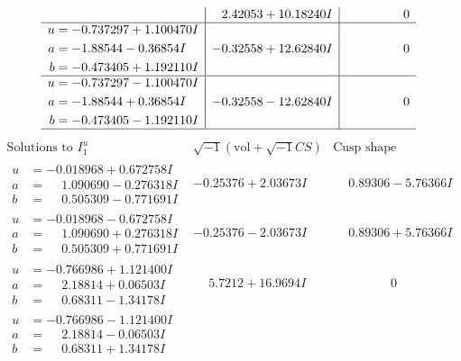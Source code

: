 \documentclass[1p]{elsarticle_modified}
\theoremstyle{definition}
\newcommand{\I}{\sqrt{-1}}
\begin{document}
$$\begin{array}{c|c|c}
 & \phantom{-}2.42053 + 10.18240 I & \phantom{-0.000000 } 0 \\ \hline\begin{aligned}
u &= -0.737297 + 1.100470 I \\
a &= -1.88544 - 0.36854 I \\
b &= -0.473405 + 1.192110 I\end{aligned}
 & -0.32558 + 12.62840 I & \phantom{-0.000000 } 0 \\ \hline\begin{aligned}
u &= -0.737297 - 1.100470 I \\
a &= -1.88544 + 0.36854 I \\
b &= -0.473405 - 1.192110 I\end{aligned}
 & -0.32558 - 12.62840 I & \phantom{-0.000000 } 0\\
 \hline 
 \end{array}$$\newpage$$\begin{array}{c|c|c}  
\text{Solutions to }I^u_{1}& \I (\text{vol} + \sqrt{-1}CS) & \text{Cusp shape}\\
 \hline 
\begin{aligned}
u &= -0.018968 + 0.672758 I \\
a &= \phantom{-}1.090690 - 0.276318 I \\
b &= \phantom{-}0.505309 - 0.771691 I\end{aligned}
 & -0.25376 + 2.03673 I & \phantom{-}0.89306 - 5.76366 I \\ \hline\begin{aligned}
u &= -0.018968 - 0.672758 I \\
a &= \phantom{-}1.090690 + 0.276318 I \\
b &= \phantom{-}0.505309 + 0.771691 I\end{aligned}
 & -0.25376 - 2.03673 I & \phantom{-}0.89306 + 5.76366 I \\ \hline\begin{aligned}
u &= -0.766986 + 1.121400 I \\
a &= \phantom{-}2.18814 + 0.06503 I \\
b &= \phantom{-}0.68311 - 1.34178 I\end{aligned}
 & \phantom{-}5.7212 + 16.9694 I & \phantom{-0.000000 } 0 \\ \hline\begin{aligned}
u &= -0.766986 - 1.121400 I \\
a &= \phantom{-}2.18814 - 0.06503 I \\
b &= \phantom{-}0.68311 + 1.34178 I\end{aligned}

\end{array}$$
\end{document}
